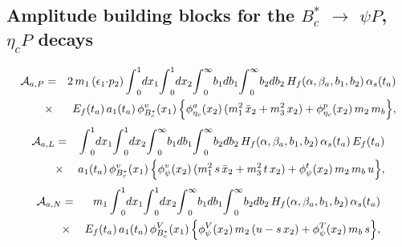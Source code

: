 \documentclass[preprint,superscriptaddress,nofootinbib]{revtex4}
\begin{document}
  \begin{appendix}
  \section{Amplitude building blocks for the $B_{c}^{\ast}$ ${\to}$
           ${\psi}P$, ${\eta}_{c}P$ decays}
  \label{block}
   \begin{eqnarray}
  {\cal A}_{a,P} &=&
  2\,m_{1}\,({\epsilon}_{1}{\cdot}p_{2})\,
  {\int}_{0}^{1}dx_{1}
  {\int}_{0}^{1}dx_{2}
  {\int}_{0}^{\infty}b_{1}db_{1}
  {\int}_{0}^{\infty}b_{2}db_{2}\,
  H_{f}({\alpha},{\beta}_{a},b_{1},b_{2})\,
  {\alpha}_{s}(t_{a})
   \nonumber \\ &{\times}&
  E_{f}(t_{a})\, a_{1}(t_{a})\,
  {\phi}_{B_{c}^{\ast}}^{v}(x_{1})\,
   \Big\{ {\phi}_{{\eta}_{c}}^{a}(x_{2})\,
   ( m_{1}^{2}\,\bar{x}_{2}+m_{3}^{2}\,x_{2} )
   + {\phi}_{{\eta}_{c}}^{p}(x_{2})\, m_{2}\,m_{b} \Big\}
   \label{amp:a-01},
   \end{eqnarray}
   \begin{eqnarray}
  {\cal A}_{a,L} &=&
  {\int}_{0}^{1}dx_{1}
  {\int}_{0}^{1}dx_{2}
  {\int}_{0}^{\infty}b_{1}db_{1}
  {\int}_{0}^{\infty}b_{2}db_{2}\,
   H_{f}({\alpha},{\beta}_{a},b_{1},b_{2})\,
  {\alpha}_{s}(t_{a})\, E_{f}(t_{a})
   \nonumber \\ &{\times}&
  a_{1}(t_{a})\, {\phi}_{B_{c}^{\ast}}^{v}(x_{1})\,
   \Big\{ {\phi}_{\psi}^{v}(x_{2})\,
   ( m_{1}^{2}\,s\,\bar{x}_{2}+m_{3}^{2}\,t\,x_{2} )
  + {\phi}_{\psi}^{t}(x_{2})\, m_{2}\,m_{b}\,u \Big\}
   \label{amp:a-02},
   \end{eqnarray}
   \begin{eqnarray}
  {\cal A}_{a,N} &=& m_{1}\,
  {\int}_{0}^{1}dx_{1}
  {\int}_{0}^{1}dx_{2}
  {\int}_{0}^{\infty}b_{1}db_{1}
  {\int}_{0}^{\infty}b_{2}db_{2}\,
   H_{f}({\alpha},{\beta}_{a},b_{1},b_{2})\,
  {\alpha}_{s}(t_{a})
   \nonumber \\ &{\times}&
  E_{f}(t_{a})\, a_{1}(t_{a})\,
  {\phi}_{B_{c}^{\ast}}^{V}(x_{1})\,
   \Big\{ {\phi}_{\psi}^{V}(x_{2})\, m_{2}\,
   ( u-s\,x_{2} )
  + {\phi}_{\psi}^{T}(x_{2})\, m_{b}\,s \Big\}
   \label{amp:a-03},
   \end{eqnarray}

\end{appendix}
\end{document}
